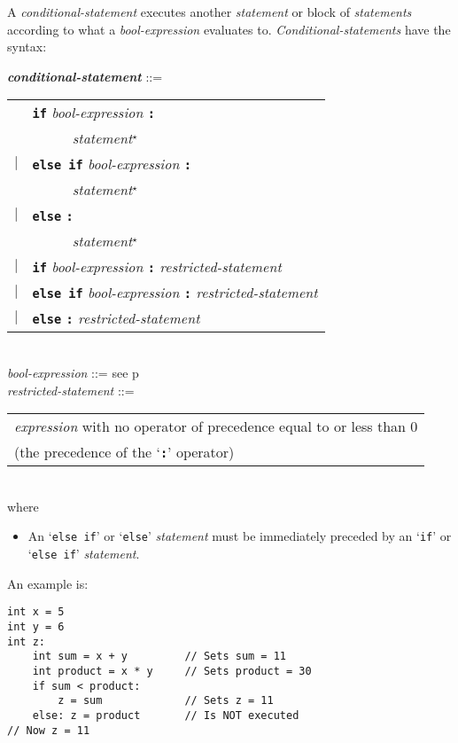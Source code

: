 \documentclass[12pt]{article}
\newcommand{\TT}[1]{{\tt \bfseries #1}}
\newcommand{\STAR}{{\Large $^\star$}}
\newcommand{\ttkey}[1]{{\tt \bfseries #1}}
\newcommand{\emkey}[1]{{\em \bfseries #1}}
\newcommand{\pagref}[1]{p\pageref{#1}}
\newenvironment{indpar}[1][0.3in]%
	{\begin{list}{}%
		     {\setlength{\itemsep}{0in}%
		      \setlength{\topsep}{0in}%
		      \setlength{\parsep}{1ex}%
		      \setlength{\labelwidth}{#1}%
		      \setlength{\leftmargin}{#1}%
		      \addtolength{\leftmargin}{\labelsep}}%
	 \item}%
	{\end{list}}
\begin{document}
A {\em conditional-statement} executes another {\em statement}
or block of {\em statements} according to what a
{\em bool-expression} evaluates to.
{\em Conditional-statements} have the syntax:

\begin{indpar}
\emkey{conditional-statement} ::= \\
\hspace*{0.5in}\begin{tabular}[t]{rl}
        & \ttkey{if} {\em bool-expression} \TT{:} \\
	& ~~~~~ {\em statement}\STAR{} \\
    $|$ & \ttkey{else if} {\em bool-expression} \TT{:} \\
	& ~~~~~ {\em statement}\STAR{} \\
    $|$ & \ttkey{else} \TT{:} \\
	& ~~~~~ {\em statement}\STAR{} \\
    $|$ & \ttkey{if} {\em bool-expression} \TT{:} {\em restricted-statement} \\
    $|$ & \ttkey{else if} {\em bool-expression} \TT{:}
    		{\em restricted-statement} \\
    $|$ & \ttkey{else} \TT{:} {\em restricted-statement} \\
	\end{tabular}
\\[0.5ex]
{\em bool-expression} ::= see \pagref{BOOL-EXPRESSION}
\\[0.5ex]
{\em restricted-statement}\label{RESTRICTED-STATEMENT} ::= \\
\hspace*{0.5in}\begin{tabular}[t]{@{}l}
   {\em expression} with no operator of precedence equal to or less than 0 \\
   (the precedence of the `\TT{:}' operator) \\
   \end{tabular}
\\[1ex]
where
\begin{itemize}
\item An `{\tt else if}' or `{\tt else}' {\em statement} must be immediately
preceded by an `{\tt if}' or `{\tt else if}' {\em statement}.
\end{itemize}
\end{indpar}

An example is:
\begin{indpar}\begin{verbatim}
int x = 5
int y = 6
int z:
    int sum = x + y         // Sets sum = 11
    int product = x * y     // Sets product = 30
    if sum < product:
        z = sum             // Sets z = 11
    else: z = product       // Is NOT executed
// Now z = 11
\end{verbatim}\end{indpar}
\end{document}
